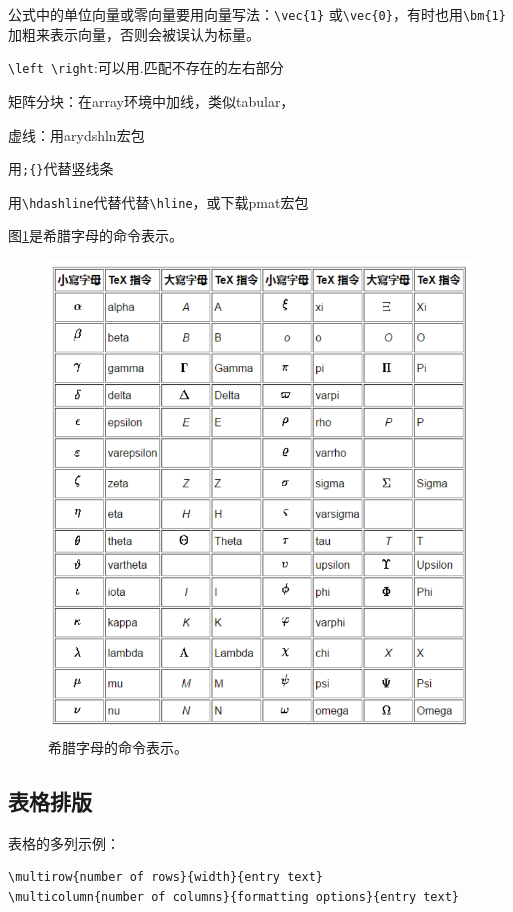 \documentclass[11pt]{ctexart}
\begin{document}
公式中的单位向量或零向量要用向量写法：\verb|\vec{1}| 或\verb|\vec{0}|，有时也用\verb|\bm{1}|加粗来表示向量，否则会被误认为标量。

\verb|\left \right|:可以用.匹配不存在的左右部分 

矩阵分块：在array环境中加线，类似tabular， 

虚线：用arydshln宏包 

用\verb|;{}|代替竖线条 

用\verb|\hdashline|代替代替\verb|\hline|，或下载pmat宏包

图\ref{fig:greeks}是希腊字母的命令表示。
\begin{figure}[htpb]
\centering
\includegraphics[width=0.7\linewidth]{greeks.png}
\caption{希腊字母的命令表示。}\label{fig:greeks}
\end{figure}


\subsection{表格排版}
表格的多列示例：
\begin{verbatim}
\multirow{number of rows}{width}{entry text}
\multicolumn{number of columns}{formatting options}{entry text}
\end{verbatim}
\end{document}

